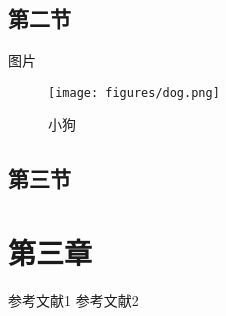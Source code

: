 \documentclass[a4paper]{article}
\begin{document}
\subsection{第二节}\label{sec2:sub2}

图片

\begin{figure}[ht]
  \centering
  \texttt{[image: figures/dog.png]}
  \caption{小狗}
  \label{fig:dog}
\end{figure}

\subsection{第三节}\label{sec2:sub3}

\section{第三章}\label{sec3}

\begin{thebibliography}{9}

 参考文献1
 参考文献2

\end{thebibliography}
\end{document}
